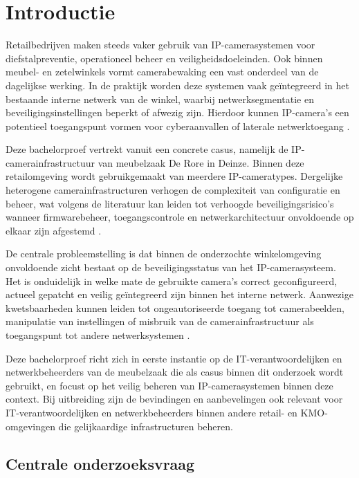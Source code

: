 \section{Introductie}

Retailbedrijven maken steeds vaker gebruik van IP-camerasystemen voor diefstalpreventie, operationeel beheer en veiligheidsdoeleinden. Ook binnen meubel- en zetelwinkels vormt camerabewaking een vast onderdeel van de dagelijkse werking. In de praktijk worden deze systemen vaak geïntegreerd in het bestaande interne netwerk van de winkel, waarbij netwerksegmentatie en beveiligingsinstellingen beperkt of afwezig zijn. Hierdoor kunnen IP-camera’s een potentieel toegangspunt vormen voor cyberaanvallen of laterale netwerktoegang \parencite{ENISA2024, Naprys2024}.

Deze bachelorproef vertrekt vanuit een concrete casus, namelijk de IP-camerainfrastructuur van meubelzaak De Rore in Deinze. Binnen deze retailomgeving wordt gebruikgemaakt van meerdere IP-cameratypes. Dergelijke heterogene camerainfrastructuren verhogen de complexiteit van configuratie en beheer, wat volgens de literatuur kan leiden tot verhoogde beveiligingsrisico’s wanneer firmwarebeheer, toegangscontrole en netwerkarchitectuur onvoldoende op elkaar zijn afgestemd \parencite{Butun2019}.

De centrale probleemstelling is dat binnen de onderzochte winkelomgeving onvoldoende zicht bestaat op de beveiligingsstatus van het \newline IP-camerasysteem. Het is onduidelijk in welke mate de gebruikte camera’s correct geconfigureerd, actueel gepatcht en veilig geïntegreerd zijn binnen het interne netwerk. Aanwezige kwetsbaarheden kunnen leiden tot ongeautoriseerde toegang tot camerabeelden, manipulatie van instellingen of misbruik van de camerainfrastructuur als toegangspunt tot andere netwerksystemen \parencite{Butun2019}.

Deze bachelorproef richt zich in eerste instantie op de IT-verantwoordelijken en netwerkbeheerders van de meubelzaak die als casus binnen dit onderzoek wordt gebruikt, en focust op het veilig beheren van IP-camerasystemen binnen deze context. Bij uitbreiding zijn de bevindingen en aanbevelingen ook relevant voor \newline IT-verantwoordelijken en netwerkbeheerders binnen andere retail- en KMO-omgevingen die gelijkaardige infrastructuren beheren.

\subsection*{Centrale onderzoeksvraag}

